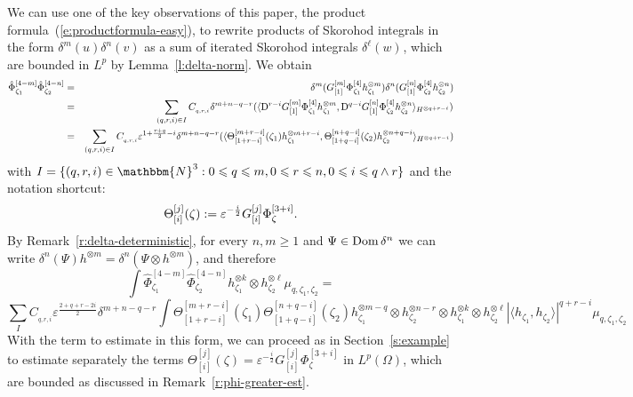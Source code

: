 We can use one of the key observations of this paper, the product
formula~(\ref{e:productformula-easy}), to rewrite products of Skorohod
integrals in the form $\delta^m (u) \delta^n (v)$ as a sum of iterated
Skorohod integrals $\delta^{\ell} (w)^{}$, which are bounded in $L^p$ by
Lemma~\ref{l:delta-norm}. We obtain
\begin{eqnarray*}
  \hat{\Phi}^{[4 - m]}_{\zeta_1} \hat{\Phi}^{[4 - n]}_{\zeta_2} & = & \delta^m
  (G_{[1]}^{[m]} \Phi^{[4]}_{\zeta_1} h^{\otimes m}_{\zeta_1}) \delta^n
  (G_{[1]}^{[n]} \Phi^{[4]}_{\zeta_2} h_{\zeta_2}^{\otimes n})\\
  & = & \sum_{(q, r, i) \in I} C_{_{q, r, i}} \delta^{m + n - q - r} (\langle
  \mathrm{D}^{r - i} G_{[1]}^{[m]} \Phi^{[4]}_{\zeta_1} h_{\zeta_1}^{\otimes m},
  \mathrm{D}^{q - i} G_{[1]}^{[n]} \Phi^{[4]}_{\zeta_2} h_{\zeta_2}^{\otimes n}
  \rangle_{H^{\otimes q + r - i}})^{}\\
  & = & \sum_{(q, r, i) \in I} C_{_{q, r, i}} \varepsilon^{1 + \frac{r +
  q}{2} - i} \delta^{m + n - q - r} (\langle \Theta^{[m + r - i]}_{[1 + r -
  i]} (\zeta_1) h_{\zeta_1}^{\otimes m + r - i}, \Theta_{[1 + q - i]}^{[n + q
  - i]} (\zeta_2) h^{\otimes n + q - i}_{\zeta_2} \rangle_{H^{\otimes q + r -
  i}})
\end{eqnarray*}
with $I = \{ (q, r, i) \in \mathbbm{N}^3 : 0 \leqslant q \leqslant m, 0
\leqslant r \leqslant n, 0 \leqslant i \leqslant q \wedge r \}$ and the
notation shortcut:
\[ \Theta_{[i]}^{[j]} (\zeta) := \varepsilon^{- \frac{i}{2}}
   G^{[j]}_{[i]} \Phi_{\zeta}^{[3 + i]} . \]
By Remark~\ref{r:delta-deterministic}, for every $n, m \geqslant 1$ and $\Psi
\in \operatorname{Dom} \delta^n$ we can write $\delta^n (\Psi) h^{\otimes m} =
\delta^n (\Psi \otimes h^{\otimes m})$, and therefore
\[ \int \hat{\Phi}^{[4 - m]}_{\zeta_1} \hat{\Phi}_{\zeta_2}^{[4 - n]}
   h^{\otimes k}_{\zeta_1} \otimes h^{\otimes \ell}_{\zeta_2} \mu_{q, \zeta_1,
   \zeta_2} = \]
\[ \sum_I C_{_{q, r, i}} \varepsilon^{\frac{2 + q + r - 2 i}{2}} \delta^{m + n
   - q - r} \int \Theta^{[m + r - i]}_{[1 + r - i]} (\zeta_1) \Theta_{[1 + q -
   i]}^{[n + q - i]} (\zeta_2) h_{\zeta_1}^{\otimes m - q} \otimes h^{\otimes
   n - r}_{\zeta_2} \otimes h^{\otimes k}_{\zeta_1} \otimes h^{\otimes
   \ell}_{\zeta_2} | \langle h_{\zeta_1}, h_{\zeta_2} \rangle |^{q + r - i}
   \mu_{q, \zeta_1, \zeta_2} \]
With the term to estimate in this form, we can proceed as in
Section~\ref{s:example} to estimate separately the terms $\Theta_{[i]}^{[j]}
(\zeta) = \varepsilon^{- \frac{i}{2}} G^{[j]}_{[i]} \Phi_{\zeta}^{[3 + i]}$ in
$L^p (\Omega)$, which are bounded as discussed in
Remark~\ref{r:phi-greater-est}.

